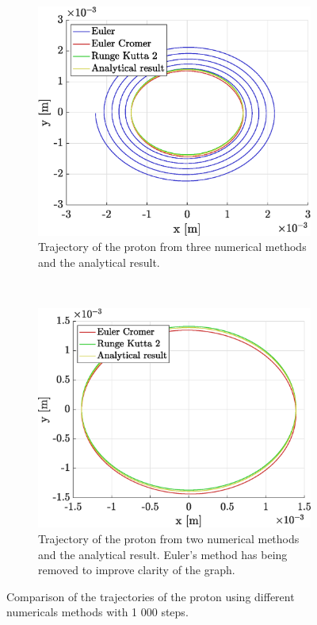 \documentclass[a4paper,12pt,twoside]{article}
\begin{document}
\begin{figure}[h]
	\centering
	\begin{subfigure}[t]{0.45\textwidth}
	\includegraphics[width=\linewidth]{graphs/ex2_ii_traj_ALL.eps}
		\caption{Trajectory of the proton from three numerical methods and the analytical result.}
		\label{fig:ex2-ii-traj-all}
	\end{subfigure}
	~
	\begin{subfigure}[t]{0.45\textwidth}
		\includegraphics[width=\linewidth]{graphs/ex2_ii_traj_NoEuler}
		\caption{Trajectory of the proton from two numerical methods and the analytical result. Euler's method has being removed to improve clarity of the graph.}
		\label{fig:ex2-ii-traj-NoEuler}
	\end{subfigure}
	
	\caption{Comparison of the trajectories of the proton using different numericals methods with 1 000 steps.}
	\label{fig:ex2-ii-traj}
\end{figure}
\end{document}
